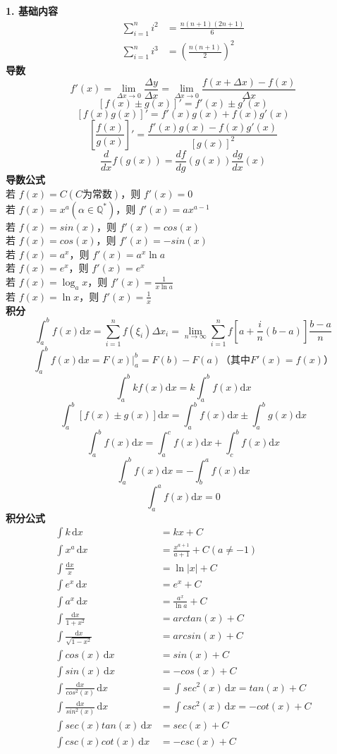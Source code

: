 \textbf{1. 基础内容}
$$
\begin{aligned}
\sum_{i=1}^{n}i^{2}&=\frac{n(n+1)(2n+1)}{6}  \\
\sum_{i=1}^{n}i^{3}&=\left(\frac{n(n+1)}{2}\right)^{2}
\end{aligned}
$$
\textbf{导数}
$$f'(x)=\lim\limits_{\Delta x \rightarrow 0} \frac{\Delta y}{\Delta x}=\lim\limits_{\Delta x \rightarrow 0} \frac{f(x+\Delta x)-f(x)}{\Delta x}$$
$$[f(x)\pm g(x)]'=f'(x)\pm g'(x)$$
$$[f(x)g(x)]'=f'(x)g(x)+f(x)g'(x)$$
$$[\frac{f(x)}{g(x)}]'=\frac{f'(x)g(x)-f(x)g'(x)}{[g(x)]^2}$$
$$\frac{d}{dx}f(g(x))=\frac{df}{dg}(g(x))\frac{dg}{dx}(x)$$
\textbf{导数公式}\\
若 $f(x)=C (C 为常数 )$，则 $f'(x)=0$ \\
若 $f(x)=x^{a} (\alpha \in \mathbb{Q}^{*})$，则 $f'(x)=ax^{a-1}$ \\
若 $f(x)=sin(x)$，则 $f'(x)=cos(x)$ \\ 
若 $f(x)=cos(x)$，则 $f'(x)=-sin(x)$ \\
若 $f(x)=a^x$，则 $f'(x)=a^x\ln a$ \\
若 $f(x)=e^x$，则 $f'(x)=e^x$ \\
若 $f(x)=\log_{a}x$，则 $f'(x)=\frac{1}{x\ln a}$ \\
若 $f(x)=\ln x$，则 $f'(x)=\frac{1}{x}$ \\
\textbf{积分}
$$\int_{a}^{b} f(x)\mathrm{d}x=\sum\limits_{i=1}^{n} f(\xi_{i})\Delta x_i=\lim\limits_{n \rightarrow \infty} \sum\limits_{i=1}^{n} f[a+\frac{i}{n}(b-a)] \frac{b-a}{n}$$
$$\int_{a}^{b}f(x)\mathrm{d}x=\left.F(x)\right|_{a} ^{b}=F(b)-F(a)（其中 F'(x)=f(x)）$$
$$\int_{a}^{b}kf(x)\mathrm{d}x=k\int_{a}^{b} f(x)\mathrm{d}x$$
$$\int_{a}^{b}[f(x)\pm g(x)]\mathrm{d}x=\int_{a}^{b}f(x)\mathrm{d}x\pm \int_{a}^{b}g(x)\mathrm{d}x$$
$$\int_{a}^{b}f(x)\mathrm{d}x=\int_{a}^{c}f(x)\mathrm{d}x+\int_{c}^{b}f(x)\mathrm{d}x$$
$$\int_{a}^{b}f(x)\mathrm{d}x=-\int_{b}^{a}f(x)\mathrm{d}x$$
$$\int_{a}^{a}f(x)\mathrm{d}x=0$$
\textbf{积分公式}
$$
\begin{aligned}
\int k\,\mathrm{d} x&=kx+C\\
\int x^a\,\mathrm{d}x&=\frac{x^{a+1}}{a+1}+C (a\neq -1)\\
\int \frac{\mathrm{d}x}{x}&=\ln|x|+C\\
\int e^x\,\mathrm{d}x&=e^x+C\\
\int a^x\,\mathrm{d}x&=\frac{a^x}{\ln a}+C\\
\int \frac{\mathrm{d}x}{1+x^2}&=arctan(x)+C\\
\int \frac{\mathrm{d}x}{\sqrt{1-x^2}}&=arcsin(x)+C\\
\int cos(x)\,\mathrm{d}x&=sin(x)+C\\
\int sin(x)\,\mathrm{d}x&=-cos(x)+C\\
\int \frac{\mathrm{d}x}{cos^2(x)}\,\mathrm{d}x&=\int sec^2(x)\,\mathrm{d}x=tan(x)+C\\
\int \frac{\mathrm{d}x}{sin^2(x)}\,\mathrm{d}x&=\int csc^2(x)\,\mathrm{d}x=-cot(x)+C\\
\int sec(x)tan(x)\,\mathrm{d}x&=sec(x)+C\\
\int csc(x)cot(x)\,\mathrm{d}x&=-csc(x)+C
\end{aligned}
$$
